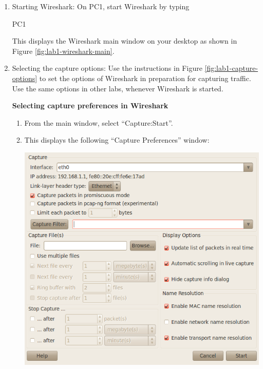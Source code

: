 \begin{enumerate}
	\item Starting Wireshark: On PC1, start Wireshark by typing 
		\begin{cmdblock}
	PC1%
		\end{cmdblock}
		This displays the Wireshark main window on your desktop as shown in Figure \ref{fig:lab1-wireshark-main}.
	\item Selecting the capture options: Use the instructions in Figure \ref{fig:lab1-capture-options} to set the options of Wireshark in preparation for capturing traffic. Use the same options in other labs, whenever Wireshark is started.
		\par
		\begin{minipage}{\linewidth}
			\begin{framed}
				\centering
				\textbf{Selecting capture preferences in Wireshark}
				\begin{enumerate}
					\item From the main window, select ``Capture:Start''.
					\item This displays the following ``Capture Preferences'' window:\par
						\includegraphics[width=\linewidth]{graphics/capture-options-updated.png}
						\begin{itemize}

\end{itemize}
\end{enumerate}
\end{framed}
\end{minipage}
\end{enumerate}
